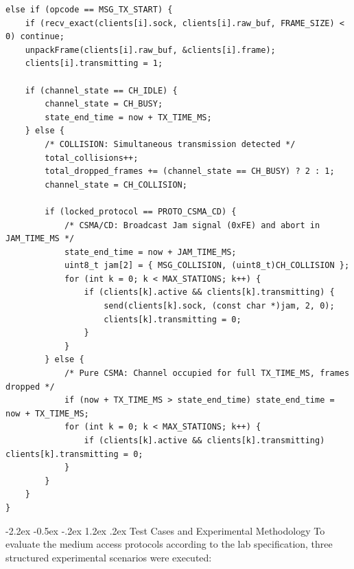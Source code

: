 \documentclass[11pt,a4paper]{article}
\makeatletter
\renewcommand\section{\@startsection {section}{1}{\z@}%
                                   {-2.2ex \@plus -0.5ex \@minus -.2ex}%
                                   {1.2ex \@plus.2ex}%
                                   {\normalfont\Large\bfseries}}
\makeatother
\begin{document}
\begin{lstlisting}[caption={Collision detection and jam signal broadcasting in \texttt{server.c}.}, label={lst:server_collision}]
else if (opcode == MSG_TX_START) {
    if (recv_exact(clients[i].sock, clients[i].raw_buf, FRAME_SIZE) < 0) continue;
    unpackFrame(clients[i].raw_buf, &clients[i].frame);
    clients[i].transmitting = 1;

    if (channel_state == CH_IDLE) {
        channel_state = CH_BUSY;
        state_end_time = now + TX_TIME_MS;
    } else {
        /* COLLISION: Simultaneous transmission detected */
        total_collisions++;
        total_dropped_frames += (channel_state == CH_BUSY) ? 2 : 1;
        channel_state = CH_COLLISION;

        if (locked_protocol == PROTO_CSMA_CD) {
            /* CSMA/CD: Broadcast Jam signal (0xFE) and abort in JAM_TIME_MS */
            state_end_time = now + JAM_TIME_MS;
            uint8_t jam[2] = { MSG_COLLISION, (uint8_t)CH_COLLISION };
            for (int k = 0; k < MAX_STATIONS; k++) {
                if (clients[k].active && clients[k].transmitting) {
                    send(clients[k].sock, (const char *)jam, 2, 0);
                    clients[k].transmitting = 0;
                }
            }
        } else {
            /* Pure CSMA: Channel occupied for full TX_TIME_MS, frames dropped */
            if (now + TX_TIME_MS > state_end_time) state_end_time = now + TX_TIME_MS;
            for (int k = 0; k < MAX_STATIONS; k++) {
                if (clients[k].active && clients[k].transmitting) clients[k].transmitting = 0;
            }
        }
    }
}
\end{lstlisting}

\section{Test Cases and Experimental Methodology}
To evaluate the medium access protocols according to the lab specification, three structured experimental scenarios were executed:
\end{document}
